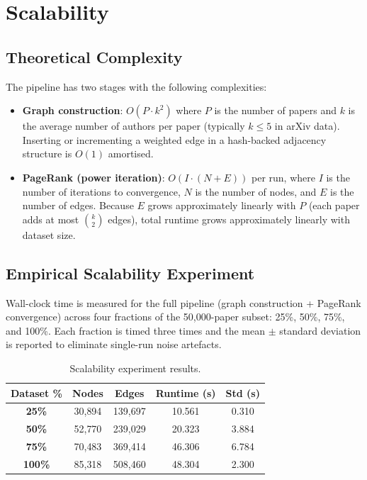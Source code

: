 \documentclass[12pt, a4paper]{article}
\begin{document}
\section{Scalability}

\subsection{Theoretical Complexity}

The pipeline has two stages with the following complexities:

\begin{itemize}
  \item \textbf{Graph construction}: $O(P \cdot k^2)$ where $P$ is the number of papers and $k$ is the average number of authors per paper (typically $k \leq 5$ in arXiv data). Inserting or incrementing a weighted edge in a hash-backed adjacency structure is $O(1)$ amortised.
  \item \textbf{PageRank (power iteration)}: $O(I \cdot (N + E))$ per run, where $I$ is the number of iterations to convergence, $N$ is the number of nodes, and $E$ is the number of edges. Because $E$ grows approximately linearly with $P$ (each paper adds at most $\binom{k}{2}$ edges), total runtime grows approximately linearly with dataset size.
\end{itemize}

\subsection{Empirical Scalability Experiment}

Wall-clock time is measured for the full pipeline (graph construction + PageRank convergence) across four fractions of the 50{,}000-paper subset: 25\%, 50\%, 75\%, and 100\%. Each fraction is timed three times and the mean $\pm$ standard deviation is reported to eliminate single-run noise artefacts.

\begin{table}[h!]
  \centering
  \caption{Scalability experiment results.}
  \label{tab:scalability}
  \begin{tabular}{>{\bfseries}c c c c c}
    \toprule
    Dataset \% & Nodes & Edges & Runtime (s) & Std (s) \\
    \midrule
    25\%  & 30{,}894 & 139{,}697 & 10.561 & 0.310 \\
    50\%  & 52{,}770 & 239{,}029 & 20.323 & 3.884 \\
    75\%  & 70{,}483 & 369{,}414 & 46.306 & 6.784 \\
    100\% & 85{,}318 & 508{,}460 & 48.304 & 2.300 \\
    \bottomrule
  \end{tabular}
\end{table}
\end{document}
